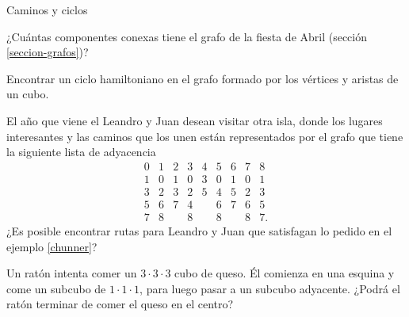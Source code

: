 \begin{section}{Caminos y ciclos}
\begin{enumex}
\item ¿Cuántas componentes conexas tiene el grafo de la fiesta de Abril (sección \ref{seccion-grafos})?
\item Encontrar un ciclo hamiltoniano en el grafo formado por los vértices y aristas de un
cubo.
\item El año que viene el Leandro y Juan desean visitar otra isla, donde los lugares interesantes y las caminos que los unen están representados por el grafo que tiene la siguiente lista de adyacencia
$$
\begin{matrix}
0&1&2&3&4&5&6&7&8\\ \hline
1&0&1&0&3&0&1&0&1\\
3&2&3&2&5&4&5&2&3\\
5&6&7&4&&6&7&6&5\\
7&8&&8&&8&&8&7.
\end{matrix}
$$
¿Es posible encontrar rutas para Leandro y Juan que satisfagan lo pedido en el ejemplo \ref{chunner}?
\item Un ratón intenta comer un $3\cdot 3\cdot 3$ cubo de queso. Él comienza en una esquina y come un subcubo de $1\cdot 1\cdot 1$, para luego pasar a un subcubo  adyacente. ¿Podrá el ratón terminar de comer el queso en el centro?
\end{enumex}

\end{section}



